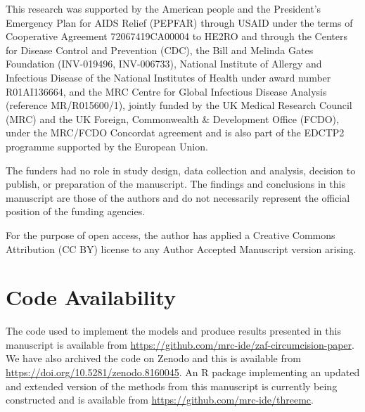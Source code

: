 \documentclass{article}
\begin{document}
This research was supported by the American people and the President's Emergency Plan for AIDS Relief (PEPFAR) through USAID under the terms of Cooperative Agreement 72067419CA00004 to HE2RO and through the Centers for Disease Control and Prevention (CDC), the Bill and Melinda Gates Foundation (INV-019496, INV-006733), National Institute of Allergy and Infectious Disease of the National Institutes of Health under award number R01AI136664, and the MRC Centre for Global Infectious Disease Analysis (reference MR/R015600/1), jointly funded by the UK Medical Research Council (MRC) and the UK Foreign, Commonwealth \& Development Office (FCDO), under the MRC/FCDO Concordat agreement and is also part of the EDCTP2 programme supported by the European Union.

The funders had no role in study design, data collection and analysis, decision to publish, or preparation of the manuscript. The findings and conclusions in this manuscript are those of the authors and do not necessarily represent the official position of the funding agencies.

For the purpose of open access, the author has applied a Creative Commons Attribution (CC BY) license to any Author Accepted Manuscript version arising.


\section*{Code Availability}


The code used to implement the models and produce results presented in this manuscript is available from \url{https://github.com/mrc-ide/zaf-circumcision-paper}. We have also archived the code on Zenodo and this is available from \url{https://doi.org/10.5281/zenodo.8160045}. An R package implementing an updated and extended version of the methods from this manuscript is currently being constructed and is available from \url{https://github.com/mrc-ide/threemc}.

\end{document}
